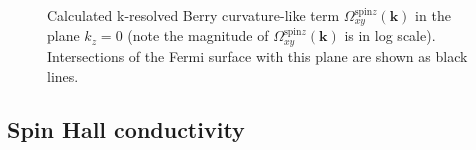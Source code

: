 \begin{figure}[htb!]
	\centering
	\qquad
	\caption{Calculated k-resolved Berry curvature-like term 
		$\Omega_{xy}^{\text{spin}z}(\bm k)$ in the plane $k_z=0$ 
		(note the magnitude of $\Omega_{xy}^{\text{spin}z}(\bm k)$ is in log scale). 
		Intersections of the Fermi surface
		with this plane are shown as black lines.}
	\label{fig29.2}
\end{figure}

\clearpage
\subsection*{Spin Hall conductivity}

